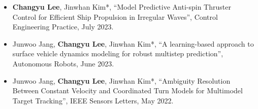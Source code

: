 \documentclass[10pt, letterpaper]{article}
\begin{document}
\begin{itemize}
            \vspace{0.2 cm}

            \item [\textbf{[J3]}] \textbf{Changyu Lee}, Jinwhan Kim*, “Model Predictive Anti-spin Thruster Control for Efficient Ship Propulsion in Irregular Waves”, \textcolor{NavyBlue}{Control Engineering Practice}, July 2023.

            \vspace{0.2 cm}

            \item [\textbf{[J2]}] Junwoo Jang, \textbf{Changyu Lee}, Jinwhan Kim*, “A learning-based approach to surface vehicle dynamics modeling for robust multistep prediction”, \textcolor{NavyBlue}{Autonomous Robots}, June 2023.

            \vspace{0.2 cm}

            \item [\textbf{[J1]}] Junwoo Jang, \textbf{Changyu Lee}, Jinwhan Kim*, “Ambiguity Resolution Between Constant Velocity and Coordinated Turn Models for Multimodel Target Tracking”, \textcolor{NavyBlue}{IEEE Sensors Letters}, May 2022.
        \end{itemize}
       
    
\end{document}
